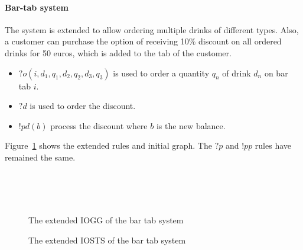 \paragraph*{Bar-tab system}
The system is extended to allow ordering multiple drinks of different types. Also, a customer can purchase the option of receiving 10\% discount on all ordered drinks for 50 euros, which is added to the tab of the customer.
\vspace{5px}
\begin{itemize}
\item $?o(i,d_1,q_1,d_2,q_2,d_3,q_3)$ is used to order a quantity $q_n$ of drink $d_n$ on bar tab $i$. 
\item $?\mathit{d}$ is used to order the discount.
\item $!pd(b)$ process the discount where $b$ is the new balance. 
\end{itemize}
\vspace{5px}
Figure~\ref{fig:gg-bartab-extended} shows the extended rules and initial graph. The $?p$ and $!pp$ rules have remained the same.

\begin{figure}[ht]
  \begin{center}
    \hspace{20px}
    \subfloat[!pd (priority 1)]{\label{fig:process_discount}}\\
    \subfloat[?o (priority 1)]{\label{fig:order-tab-extended}}\hspace{20px}
    \subfloat[?d (priority 0)]{\label{fig:discount}}\\
    \subfloat[!po (priority 1)]{\label{fig:process_order-extended}}\\
  \end{center}
  \caption{The extended IOGG of the bar tab system}
  \label{fig:gg-bartab-extended}
\end{figure}

\begin{figure}[ht]
  \begin{center}
    
  \end{center}
  \caption{The extended IOSTS of the bar tab system}
  \label{fig:sts-bartab-extended}
\end{figure}

